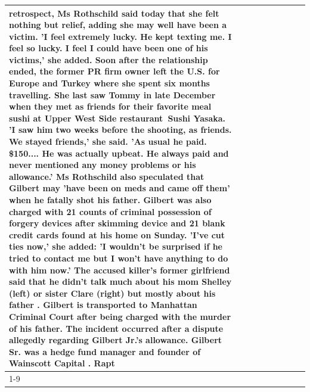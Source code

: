 \begin{table}[H]
\begin{tabular}{lllrlllll}
retrospect, Ms Rothschild said today that she felt nothing but relief, adding she may well have been a victim. 'I feel extremely lucky. He kept texting me. I feel so lucky. I feel I could have been one of his victims,' she added. Soon after the relationship ended, the former PR firm owner left the U.S. for Europe and Turkey where she spent six months  travelling. She last saw Tommy in late December when they met as friends for their favorite meal sushi at Upper West Side restaurant Sushi Yasaka. 'I saw him two weeks before the shooting, as friends. We stayed friends,' she said. 'As usual he paid. \$150.... He was actually upbeat. He always paid and never mentioned any money problems or his allowance.' Ms Rothschild also speculated that Gilbert may 'have been on meds and came off them' when he fatally shot his father. Gilbert was also charged with 21 counts of criminal possession of forgery devices after skimming device and 21 blank credit cards found at his home on Sunday. 'I've cut ties now,' she added: 'I wouldn’t be surprised if he tried to contact me but I won’t have anything to do with him now.' The accused killer's former girlfriend said that he didn't talk much about his mom Shelley (left) or sister Clare (right) but mostly about his father . Gilbert is transported to Manhattan Criminal Court  after being charged with the murder of his father. The incident occurred after a dispute allegedly regarding Gilbert Jr.'s allowance. Gilbert Sr. was a hedge fund manager and founder of Wainscott Capital . Rapt \\
\cline{1-9}

\end{tabular}
\end{table}
